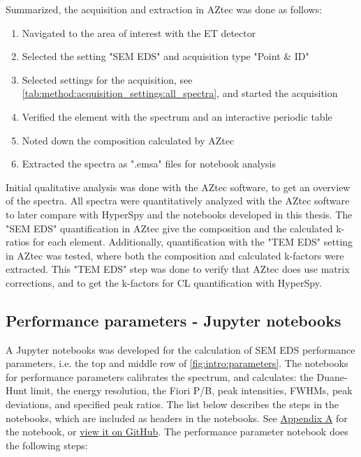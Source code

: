 Summarized, the acquisition and extraction in AZtec was done as follows:
\begin{enumerate}
    \item Navigated to the area of interest with the ET detector
    \item Selected the setting "SEM EDS" and acquisition type "Point \& ID"
    \item Selected settings for the acquisition, see \cref{tab:method:acquisition_settings:all_spectra}, and started the acquisition
    \item Verified the element with the spectrum and an interactive periodic table
    \item Noted down the composition calculated by AZtec
    \item Extracted the spectra as ".emsa" files for notebook analysis
\end{enumerate}


Initial qualitative analysis was done with the AZtec software, to get an overview of the spectra.
All spectra were quantitatively analyzed with the AZtec software to later compare with HyperSpy and the notebooks developed in this thesis.
The "SEM EDS" quantification in AZtec give the composition and the calculated k-ratios for each element.
Additionally, quantification with the "TEM EDS" setting in AZtec was tested, where both the composition and calculated k-factors were extracted.
This "TEM EDS" step was done to verify that AZtec does use matrix corrections, and to get the k-factors for CL quantification with HyperSpy.






\subsection{Performance parameters - Jupyter notebooks}
\label{method:data_treatment:notebook}

A Jupyter notebooks was developed for the calculation of SEM EDS performance parameters, i.e. the top and middle row of \cref{fig:intro:parameters}.
The notebooks for performance parameters calibrates the spectrum, and calculates: the Duane-Hunt limit, the energy resolution, the Fiori P/B, peak intensities, FWHMs, peak deviations, and specified peak ratios.
The list below describes the steps in the notebooks, which are included as headers in the notebooks.
See \hyperref[appendix:performance]{Appendix A} for the notebook, or \href{https://github.com/brynjarmorka/sem-eds-qc/blob/main/SEM_EDS_performance_parameters.ipynb}{view it on GitHub}.
The performance parameter notebook does the following steps:

